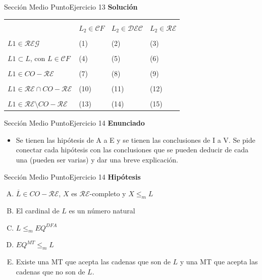 \documentclass[10pt, envcountsect, presentation, aspectratio=169]{beamer}
\newcommand{\lreg}{\ensuremath{\mathcal {REG}}}
\newcommand{\lcf}{\ensuremath{\mathcal CF}}
\newcommand{\ld}{\ensuremath{\mathcal {DEC}}}
\newcommand{\lr}{\ensuremath{\mathcal {RE}}}
\begin{document}

\begin{frame}{Sección Medio Punto}{Ejercicio 13}
    \textbf{Solución}\\
    \begin{table}[h]
             \begin{tabular}{|l|l|l|l|}
             \hline
             &&&\\
             &$L_2 \in \lcf$ &$ L_2 \in \ld$ & $ L_2 \in \lr$\\
             \hline
             &&&\\
              $ L1 \in \lreg$&(1)&(2)&(3)\\
              \hline
             &&&\\
             $ L1 \subset L$, con $L \in \lcf$&(4)&(5)&(6)\\
              \hline
             &&&\\
             $L1 \in CO-\lr $&(7)&(8)&(9)\\
              \hline
             &&&\\
             $L1 \in \lr \cap CO-\lr$&(10)&(11)&(12)\\
              \hline
             &&&\\
             $ L1 \in \lr \setminus CO-\lr$&(13)&(14)&(15)\\
              \hline
             \end{tabular}
        \end{table}
\end{frame}


\begin{frame}{Sección Medio Punto}{Ejercicio 14}
    \textbf{Enunciado}
    \begin{itemize}
        \item Se tienen las hipótesis de A a E y se tienen las conclusiones de I a V. Se pide conectar cada hipótesis con las conclusiones que se pueden deducir de cada una (pueden ser varias) y dar una breve explicación.
    \end{itemize}
\end{frame}


\begin{frame}{Sección Medio Punto}{Ejercicio 14}
    \textbf{Hipótesis}
    \begin{enumerate}[A.]
        \item $\overline{L} \in CO-\lr$, $X$ es \lr-completo y $X \le_m  L$
        \item El cardinal de $L$ es un número natural
        \item $L \le_m  EQ^{DFA}$  
        \item $EQ^{MT} \le_m L$ 
        \item Existe una MT que acepta las cadenas que son de $L$ y una MT que acepta las cadenas que no son de $L$. 
    \end{enumerate}
\end{frame}
\end{document}
